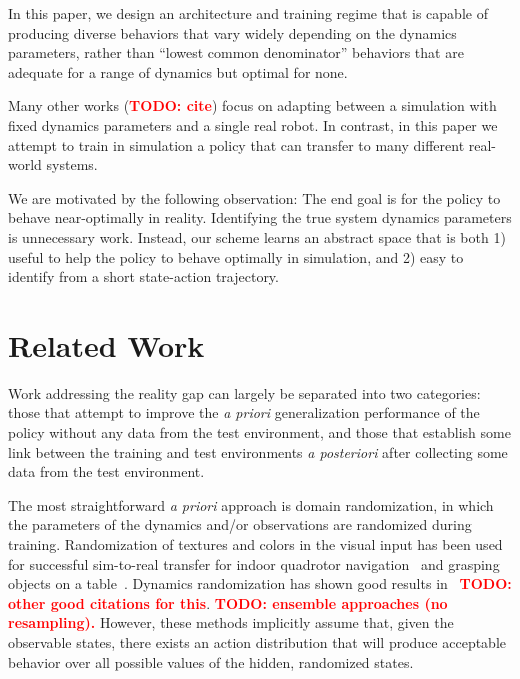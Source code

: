 \documentclass{article}
\newcommand{\TODO}[1]{\textcolor{red}{\textbf{TODO: #1}}}
\begin{document}
In this paper, we design an architecture and training regime that is capable of producing diverse behaviors that vary widely depending on the dynamics parameters,
rather than ``lowest common denominator'' behaviors that are adequate for a range of dynamics but optimal for none.

Many other works (\TODO{cite}) focus on adapting between a simulation with fixed dynamics parameters and a single real robot.
In contrast, in this paper we attempt to train in simulation a policy that can transfer to many different real-world systems.

We are motivated by the following observation:
The end goal is for the policy to behave near-optimally in reality.
Identifying the true system dynamics parameters is unnecessary work.
Instead, our scheme learns an abstract space that is both
1) useful to help the policy to behave optimally in simulation, and
2) easy to identify from a short state-action trajectory.

\section{Related Work}
Work addressing the reality gap can largely be separated into two categories:
those that attempt to improve the \emph{a priori} generalization performance of the policy without any data from the test environment,
and those that establish some link between the training and test environments \emph{a posteriori} after collecting some data from the test environment.

The most straightforward \emph{a priori} approach is domain randomization,
in which the parameters of the dynamics and/or observations are randomized during training.
Randomization of textures and colors in the visual input has been used for successful sim-to-real transfer
for indoor quadrotor navigation~\citep{sadeghi-cad2rl-rss17}
and grasping objects on a table~\citep{tobin-domainrand-arxiv17}.
Dynamics randomization has shown good results in~\citet{antonova-pivoting-corr17} \TODO{other good citations for this}.
\TODO{ensemble approaches (no resampling).}
However, these methods implicitly assume that, given the observable states,
there exists an action distribution that will produce acceptable behavior over all possible values of the hidden, randomized states.

\end{document}
